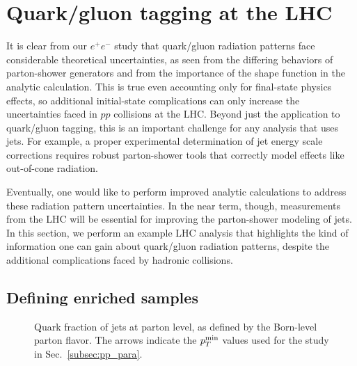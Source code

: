 \documentclass[11pt,letterpaper]{article}
\DeclareRobustCommand{\Sec}[1]{Sec.~\ref{#1}}
\begin{document}
\section{Quark/gluon tagging at the LHC}
\label{sec:pp}

It is clear from our $e^+e^-$ study that quark/gluon radiation patterns face considerable theoretical uncertainties, as seen from the differing behaviors of parton-shower generators and from the importance of the shape function in the analytic calculation.  This is true even accounting only for final-state physics effects, so additional initial-state complications can only increase the uncertainties faced in $pp$ collisions at the LHC.  Beyond just the application to quark/gluon tagging, this is an important challenge for any analysis that uses jets.  For example, a proper experimental determination of jet energy scale corrections requires robust parton-shower tools that correctly model effects like out-of-cone radiation.

Eventually, one would like to perform improved analytic calculations to address these radiation pattern uncertainties.  In the near term, though, measurements from the LHC will be essential for improving the parton-shower modeling of jets.  In this section, we perform an example LHC analysis that highlights the kind of information one can gain about quark/gluon radiation patterns, despite the additional complications faced by hadronic collisions.

\subsection{Defining enriched samples}

\begin{figure}
\centering
{}
\caption{Quark fraction of jets at parton level, as defined by the Born-level parton flavor.  The arrows indicate the $p_T^{\rm min}$ values used for the study in \Sec{subsec:pp_para}.}
\label{fig:parton_level_qg_composition}
\end{figure}
\end{document}
